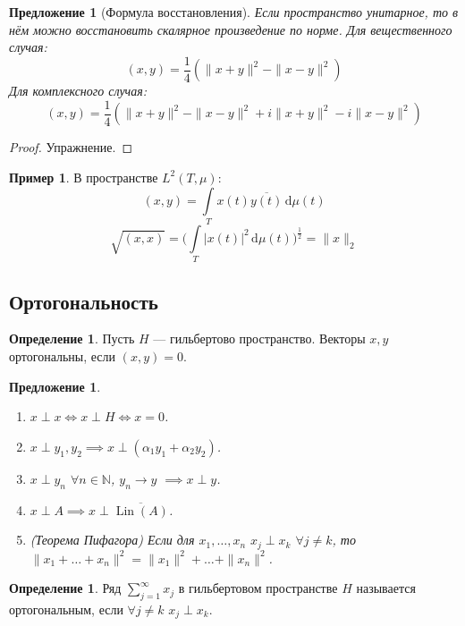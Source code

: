 \documentclass[11pt,openany,a4paper]{scrartcl}
\theoremstyle{plain}
\newtheorem{proposition}[theorem]{Предложение}
\theoremstyle{definition}
\newtheorem{definition}[theorem]{Определение}
\newtheorem{example}[theorem]{Пример}
\newcommand\mb{\mathbb}
\newcommand{\dif}{\, \mathrm d}
\newcommand\ol{\overline}
\DeclareMathOperator{\Lin}{Lin}
\begin{document}
\begin{proposition}[Формула восстановления]
    Если пространство унитарное, то в нём можно восстановить скалярное 
    произведение по норме. Для вещественного случая:
    $$
    (x, y) = \frac{1}{4}(\|x + y\|^2 - \|x - y\|^2)
    $$
    Для комплексного случая:
    $$
    (x, y) = \frac{1}{4}(\|x + y\|^2 - \|x - y\|^2 + i\|x + y\|^2 - i\|x - y\|^2)
    $$
\end{proposition}
\begin{proof}
    Упражнение.
\end{proof}

\begin{example}
    В пространстве $L^2(T, \mu)$:
    $$
    (x, y) = \int\limits_T x(t)\ol{y(t)}\dif \mu(t)
    $$
    $$
    \sqrt{(x, x)} = \bigg(\int\limits_T |x(t)|^2\dif \mu(t)\bigg)^\frac{1}{2} =
    \|x\|_2
    $$
\end{example}

\subsection{Ортогональность}

\begin{definition}
    Пусть $H$ — гильбертово пространство. Векторы $x, y$ ортогональны, если
    $(x, y) = 0$.
\end{definition}

\begin{proposition}
    \begin{enumerate}
        \item $x \perp x \iff x \perp H \iff x = 0$.
        \item $x \perp y_1, y_2 \implies x \perp (\alpha_1y_1 + \alpha_2y_2)$.
        \item $x \perp y_n$ $\forall n \in \mb N$, $y_n \to y$ $\implies
        x \perp y$.
        \item $x \perp A \implies x \perp \ol{\Lin(A)}$.
        \item (Теорема Пифагора) Если для $x_1, \ldots, x_n$ $x_j \perp x_k$
        $\forall j \neq k$, то $\|x_1 + \ldots + x_n\|^2 =
        \|x_1\|^2 + \ldots + \|x_n\|^2$.
    \end{enumerate}
\end{proposition}

\begin{definition}
    Ряд $\sum\limits_{j=1}^\infty x_j$ в гильбертовом пространстве $H$ называется
    ортогональным, если $\forall j\neq k$ $x_j \perp x_k$.
\end{definition}
\end{document}
